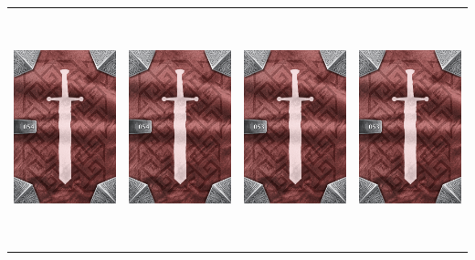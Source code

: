 \documentclass{minimal}
\begin{document}
{\begin{longtable}{llll}
\includegraphics[width=44mm,height=68mm]{./50-56/gh-054-staff-of-eminence-back.png} &
\includegraphics[width=44mm,height=68mm]{./50-56/gh-054-staff-of-eminence-back.png} &
\includegraphics[width=44mm,height=68mm]{./50-56/gh-053-black-knife-back.png} &
\includegraphics[width=44mm,height=68mm]{./50-56/gh-053-black-knife-back.png}\\ 

\end{longtable}}
\end{document}

